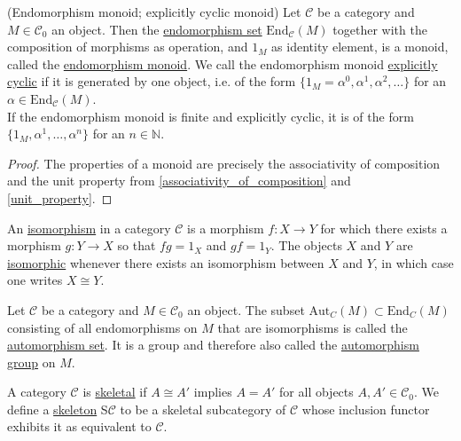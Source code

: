 \begin{remark}{(Endomorphism monoid; explicitly cyclic monoid)}\label{rmk:endo_monoid}
Let $\mathcal{C}$ be a category and $M \in \mathcal{C}_{0}$ an object. Then the \ul{endomorphism set} $\mathrm{End}_{\mathcal{C}}(M)$
together with the composition of morphisms as operation, and $1_{M}$ as identity element, is a monoid, called the \ul{endomorphism monoid}.
We call the endomorphism monoid \ul{explicitly cyclic} if it is generated by one object, i.e. of the form $\{1_{M} = \alpha^{0}, \alpha^{1},
\alpha^{2}, \dots \}$ for an $\alpha \in \mathrm{End}_{\mathcal{C}}(M)$.\\
If the endomorphism monoid is finite and explicitly cyclic, it is of the form $\{1_{M}, \alpha^{1}, \dots, \alpha^{n}\}$ for an $n \in \mathbb{N}$.
\end{remark}
\begin{proof}
The properties of a monoid are precisely the associativity of composition and the unit property from \ref{associativity_of_composition} and
\ref{unit_property}.
\end{proof}

\begin{definition}[Isomorphism]
An \ul{isomorphism} in a category $\mathcal{C}$ is a morphism $f : X \rightarrow Y$ for which there exists a morphism
$g : Y \rightarrow X$ so that $fg = 1_{X}$ and $gf = 1_{Y}$. The objects $X$ and $Y$ are \ul{isomorphic} whenever there
exists an isomorphism between $X$ and $Y$, in which case one writes $X \cong Y$.
\end{definition}

\begin{definition}
Let $\mathcal{C}$ be a category and $M \in \mathcal{C}_{0}$ an object. The subset $\mathrm{Aut}_{C}(M) \subset \mathrm{End}_{C}(M)$
consisting of all endomorphisms on $M$ that are isomorphisms is called the \ul{automorphism set}. It is a group and therefore also called
the \ul{automorphism group} on $M$.
\end{definition}

\begin{definition}
A category $\mathcal{C}$ is \ul{skeletal} if $A \cong A'$ implies $A = A'$ for all objects $A, A' \in \mathcal{C}_{0}$.
We define a \ul{skeleton} S$\mathcal{C}$ to be a skeletal subcategory of $\mathcal{C}$ whose inclusion functor exhibits it
as equivalent to $\mathcal{C}$.
\end{definition}

